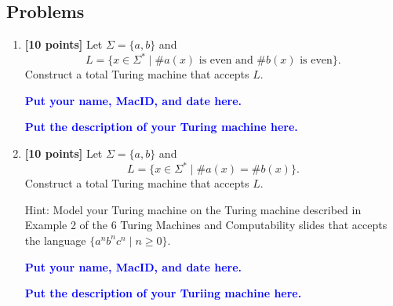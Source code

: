 \documentclass[11pt,fleqn]{article}
\newcommand{\be}{\begin{enumerate}}
\newcommand{\ee}{\end{enumerate}}
\newcommand{\set}[1]{{\{ #1 \}}}
\begin{document}
\newpage

\subsection*{Problems}

\be

  \item \textbf{[10 points]} Let $\Sigma = \set{a,b}$ and \[L = \set{x
    \in \Sigma^* \mid \#a(x) \text{ is even and } \#b(x) \text{ is
      even}}.\] Construct a total Turing machine that accepts $L$.

  \bigskip

  \textcolor{blue}{\textbf{Put your name, MacID, and date here.}}

  \textcolor{blue}{\textbf{Put the description of your Turing machine here.}}

  \item \textbf{[10 points]} Let $\Sigma = \set{a,b}$ and \[L = \set{x
    \in \Sigma^* \mid \#a(x) = \#b(x)}.\] Construct a total Turing
    machine that accepts $L$.  

    Hint: Model your Turing machine on the Turing machine described in
    Example 2 of the 6 Turing Machines and Computability slides that
    accepts the language $\set{a^nb^nc^n \mid n \ge 0}$.

  \bigskip

  \textcolor{blue}{\textbf{Put your name, MacID, and date here.}}

  \textcolor{blue}{\textbf{Put the description of your Turiing machine here.}}

\ee
\end{document}
